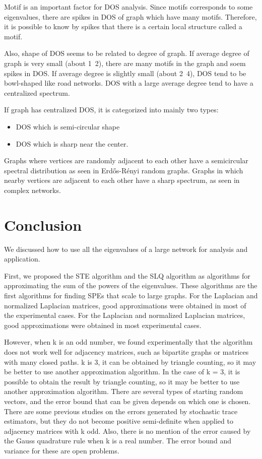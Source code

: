\documentclass[senior,final,11pt]{iscs-thesis}
\begin{document}
Motif is an important factor for DOS analysis. Since motifs corresponds to some eigenvalues, there are spikes in DOS of graph which have many motifs. Therefore, it is possible to know by spikes that there is a certain local structure called a motif.

Also, shape of DOS seems to be related to degree of graph. If average degree of graph is very small (about 1~2), there are many motifs in the graph and soem spikes in DOS. If average degree is slightly small (about 2~4), DOS tend to be bowl-shaped like road networks. DOS with a large average degree tend to have a centralized spectrum.

If graph has centralized DOS, it is categorized into mainly two types:
\begin{itemize}
  \item DOS which is semi-circular shape
  \item DOS which is sharp near the center.
\end{itemize}
Graphs where vertices are randomly adjacent to each other have a semicircular spectral distribution as seen in Erdős-Rényi random graphs. Graphs in which nearby vertices are adjacent to each other have a sharp spectrum, as seen in complex networks.




\chapter{Conclusion}
We discussed how to use all the eigenvalues of a large network for analysis and application.

First, we proposed the STE algorithm and the SLQ algorithm as algorithms for approximating the sum of the powers of the eigenvalues. These algorithms are the first algorithms for finding SPEs that scale to large graphs. For the Laplacian and normalized Laplacian matrices, good approximations were obtained in most of the experimental cases. For the Laplacian and normalized Laplacian matrices, good approximations were obtained in most experimental cases.

However, when k is an odd number, we found experimentally that the algorithm does not work well for adjacency matrices, such as bipartite graphs or matrices with many closed paths. k is 3, it can be obtained by triangle counting, so it may be better to use another approximation algorithm. In the case of k = 3, it is possible to obtain the result by triangle counting, so it may be better to use another approximation algorithm. There are several types of starting random vectors, and the error bound that can be given depends on which one is chosen. There are some previous studies on the errors generated by stochastic trace estimators, but they do not become positive semi-definite when applied to adjacency matrices with k odd. Also, there is no mention of the error caused by the Gauss quadrature rule when k is a real number. The error bound and variance for these are open problems.
\end{document}
